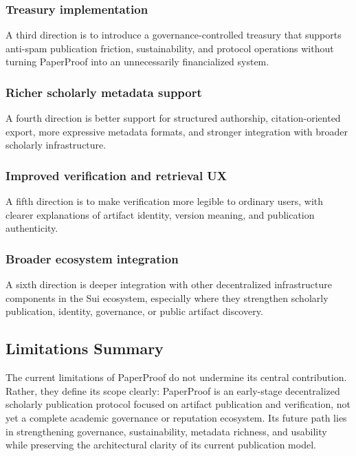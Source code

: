 \documentclass[journal]{IEEEtran}
\begin{document}
\subsubsection{Treasury implementation}

A third direction is to introduce a governance-controlled treasury that supports anti-spam publication friction, sustainability, and protocol operations without turning PaperProof into an unnecessarily financialized system.

\subsubsection{Richer scholarly metadata support}

A fourth direction is better support for structured authorship, citation-oriented export, more expressive metadata formats, and stronger integration with broader scholarly infrastructure.

\subsubsection{Improved verification and retrieval UX}

A fifth direction is to make verification more legible to ordinary users, with clearer explanations of artifact identity, version meaning, and publication authenticity.

\subsubsection{Broader ecosystem integration}

A sixth direction is deeper integration with other decentralized infrastructure components in the Sui ecosystem, especially where they strengthen scholarly publication, identity, governance, or public artifact discovery.

\subsection{Limitations Summary}

The current limitations of PaperProof do not undermine its central contribution. Rather, they define its scope clearly: PaperProof is an early-stage decentralized scholarly publication protocol focused on artifact publication and verification, not yet a complete academic governance or reputation ecosystem. Its future path lies in strengthening governance, sustainability, metadata richness, and usability while preserving the architectural clarity of its current publication model.
\end{document}
